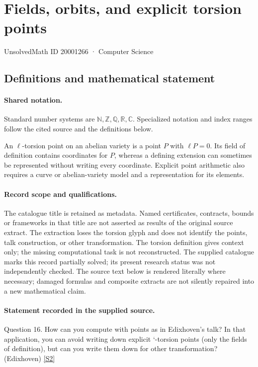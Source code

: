 \documentclass[11pt]{article}
\newcommand{\sref}[2]{\hyperlink{source:#1:#2}{[S#2]}}
\begin{document}
\setcounter{section}{20001265}
\section{Fields, orbits, and explicit torsion points}\label{20001266}
{\small\sffamily UnsolvedMath ID 20001266 · Computer Science}
\subsection{Definitions and mathematical statement}

\paragraph{Shared notation.}Standard number systems are $\mathbb N,\mathbb Z,\mathbb Q,\mathbb R,\mathbb C$. Specialized notation and index ranges follow the cited source and the definitions below.


An $\ell$-torsion point on an abelian variety is a point $P$ with $\ell P=0$. Its field of definition contains coordinates for $P$, whereas a defining extension can sometimes be represented without writing every coordinate. Explicit point arithmetic also requires a curve or abelian-variety model and a representation for its elements.
\paragraph{Record scope and qualifications.}
The catalogue title is retained as metadata. Named certificates, contracts, bounds or frameworks in that title are not asserted as results of the original source extract.
The extraction loses the torsion glyph and does not identify the points, talk construction, or other transformation. The torsion definition gives context only; the missing computational task is not reconstructed. The supplied catalogue marks this record partially solved; its present research status was not independently checked.
The source text below is rendered literally where necessary; damaged formulas and composite extracts are not silently repaired into a new mathematical claim.
\paragraph{Statement recorded in the supplied source.}
Question 16. How can you compute with points as in Edixhoven's talk? In that application, you can avoid writing down explicit `-torsion points (only the fields of definition), but can you write them down for other transformation? (Edixhoven) \sref{20001266}{2}
\end{document}
